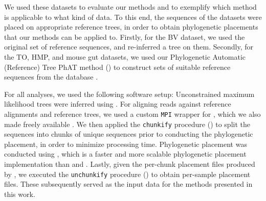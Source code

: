 We used these datasets to evaluate our methods and to exemplify which method is applicable to what kind of data.
To this end, the sequences of the datasets were placed on appropriate reference trees,
in order to obtain phylogenetic placements that our methods can be applied to.
Firstly, for the \ac{BV} dataset, we used the original set of reference sequences, and re-inferred a tree on them.
Secondly, for the \ac{TO}, \ac{HMP}, and mouse gut datasets,
we used our Phylogenetic Automatic (Reference) Tree \ac{PhAT} method ()
to construct sets of suitable reference sequences from the  database \cite{Quast2013,Yilmaz2014}.

For all analyses, we used the following software setup:
Unconstrained maximum likelihood trees were inferred using  \cite{Stamatakis2014}.
For aligning reads against reference alignments and reference trees,
we used a custom \texttt{\acs{MPI}} wrapper for  \cite{Berger2011a,Berger2012},
which we also made freely available \cite{PaPaRaMPI}.
We then applied the \texttt{chunkify} procedure ()
to split the sequences into chunks of unique sequences prior to conducting the phylogenetic placement,
in order to minimize processing time.
Phylogenetic placement was conducted using  \cite{Barbera2018},
which is a faster and more scalable phylogenetic placement implementation
than  \cite{Berger2011} and  \cite{Matsen2010}.
Lastly, given the per-chunk placement files produced by , we executed the \texttt{unchunkify} procedure
() to obtain per-sample placement files.
These subsequently served as the input data for the methods presented in this work.


